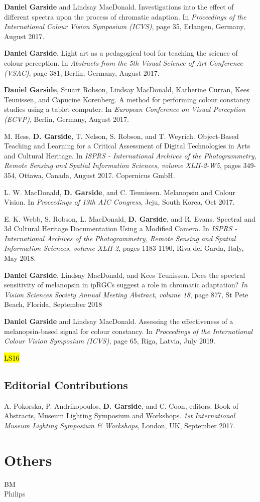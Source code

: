{\textbf{Daniel Garside} and Lindsay MacDonald. Investigations into the effect of different spectra upon the process of chromatic adaption. In \textit{Proceedings of the International Colour Vision Symposium (ICVS)}, page 35, Erlangen, Germany, August 2017.
\bigskip

\textbf{Daniel Garside}. Light art as a pedagogical tool for teaching the science of colour perception. In \textit{Abstracts from the 5th Visual Science of Art Conference (VSAC)}, page 381, Berlin, Germany, August 2017. 
\bigskip

\textbf{Daniel Garside}, Stuart Robson, Lindsay MacDonald, Katherine Curran, Kees Teunissen, and Capucine Korenberg.  A method for performing colour constancy studies using a tablet computer. In \textit{European Conference on Visual Perception (ECVP)}, Berlin, Germany, August 2017. 
\bigskip

M. Hess, \textbf{D. Garside}, T. Nelson, S. Robson, and T. Weyrich.  Object-Based Teaching and Learning for a Critical Assessment of Digital Technologies in Arts and Cultural Heritage. In \textit{ISPRS - International Archives of the Photogrammetry, Remote Sensing and Spatial Information Sciences, volume XLII-2-W5}, pages 349-354, Ottawa, Canada, August 2017. Copernicus GmbH. 
\bigskip

L. W. MacDonald, \textbf{D. Garside}, and C. Teunissen. Melanopsin and Colour Vision. In \textit{Proceedings of 13th AIC Congress}, Jeju, South Korea, Oct 2017.
\bigskip

E. K. Webb, S. Robson, L. MacDonald, \textbf{D. Garside}, and R. Evans. Spectral and 3d Cultural Heritage Documentation Using a Modified Camera. In \textit{ISPRS - International Archives of the Photogrammetry, Remote Sensing and Spatial Information Sciences, volume XLII-2}, pages 1183-1190, Riva del Garda, Italy, May 2018. 
\bigskip

\textbf{Daniel Garside}, Lindsay MacDonald, and Kees Teunissen. Does the spectral sensitivity of melanopsin in ipRGCs suggest a role in chromatic adaptation?  \textit{In Vision Sciences Society Annual Meeting Abstract, volume 18}, page 877, St Pete Beach, Florida, September 2018 
\bigskip

\textbf{Daniel Garside} and Lindsay MacDonald. Assessing the effectiveness of a melanopsin-based signal for colour constancy. In \textit{Proceedings of the International Colour Vision Symposium (ICVS)}, page 65, Riga, Latvia, July 2019. 
\bigskip

\hl{LS16}


\subsection*{Editorial Contributions}
A. Pokorska, P. Andrikopoulos, \textbf{D. Garside}, and C. Coon, editors. Book of Abstracts, Museum Lighting Symposium and Workshops.  \textit{1st International Museum Lighting Symposium \& Workshops}, London, UK, September 2017. 

}

\section{Others}
BM\\
Philips \\